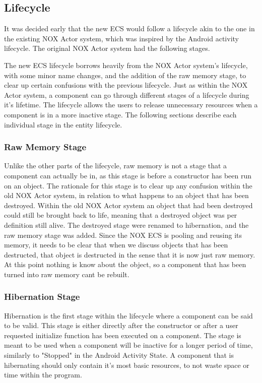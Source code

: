 \subsection{Lifecycle}
\label{subsec:high_level_lifecycle}
It was decided early that the new ECS would follow a lifecycle akin to the one in the existing NOX Actor system,
which was inspired by the Android activity lifecycle\cite{android_activity_lifecycle}.
The original NOX Actor system had the following stages.

The new ECS lifecycle borrows heavily from the NOX Actor system's lifecycle, with some minor name changes,
and the addition of the raw memory stage, to clear up certain confusions with the previous lifecycle.
Just as within the NOX Actor system, a component can go through different stages of a lifecycle during it's lifetime.
The lifecycle allows the users to release unnecessary resources when a component is in a more inactive stage.
The following sections describe each individual stage in the entity lifecycle.

\subsubsection{Raw Memory Stage}
Unlike the other parts of the lifecycle, raw memory is not a stage that a component can actually be in,
as this stage is before a constructor has been run on an object.
The rationale for this stage is to clear up any confusion within the old NOX Actor system,
in relation to what happens to an object that has been destroyed.
Within the old NOX Actor system an object that had been destroyed could still be brought back to life,
meaning that a destroyed object was per definition still alive.
The destroyed stage were renamed to hibernation, and the raw memory stage was added.
Since the NOX ECS is pooling and reusing its memory, it needs to be clear that when we discuss objects
that has been destructed, that object is destructed in the sense that it is now just raw memory.
At this point nothing is know about the object, so a component that has been turned into raw memory cant be rebuilt.

\subsubsection{Hibernation Stage}
Hibernation is the first stage within the lifecycle where a component can be said to be valid.
This stage is either directly after the constructor or after a user requested initialize function has been executed on a component.
The stage is meant to be used when a component will be inactive for a longer period of time, similarly to "Stopped" in the Android Activity State\cite[Activity state and ejection from memory]{android_activity_lifecycle}.
A component that is hibernating should only contain it's most basic resources, to not waste space or time within the program.

